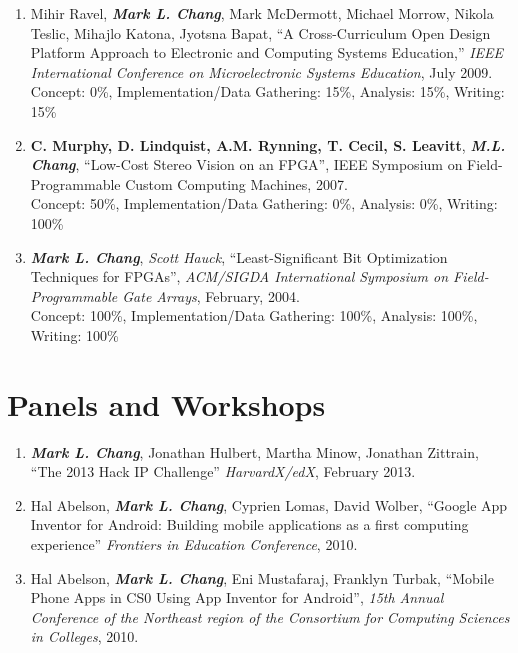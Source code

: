 \documentclass[line]{res}
\begin{document}
\begin{resume}
\begin{enumerate}
		\item Mihir Ravel, \textbf{\textit{Mark L. Chang}}, Mark McDermott, Michael Morrow, Nikola Teslic, Mihajlo Katona, Jyotsna Bapat, ``A Cross-Curriculum Open Design Platform Approach to Electronic and Computing Systems Education,'' \emph{IEEE International Conference on Microelectronic Systems Education}, July 2009.\\
		Concept: 0\%, Implementation/Data Gathering: 15\%, Analysis: 15\%, Writing: 15\%
		
		\item \textbf{C. Murphy, D. Lindquist, A.M. Rynning, T. Cecil, S. Leavitt}, \textbf{\textit{M.L. Chang}}, ``Low-Cost Stereo Vision on an FPGA'', IEEE Symposium on Field-Programmable Custom Computing Machines, 2007.\\
		Concept: 50\%, Implementation/Data Gathering: 0\%, Analysis: 0\%, Writing: 100\%
		
		\item \textbf{\textit{Mark L. Chang}}, \textit{Scott Hauck}, ``Least-Significant Bit Optimization Techniques for FPGAs'', \emph{ACM/SIGDA International Symposium on Field-Programmable Gate Arrays}, February, 2004.\\
		Concept: 100\%, Implementation/Data Gathering: 100\%, Analysis: 100\%, Writing: 100\%
	\end{enumerate}
	
	\section{\sc Panels and Workshops}
	\begin{enumerate}
		\item \textbf{\textit{Mark L. Chang}}, Jonathan Hulbert, Martha Minow, Jonathan Zittrain, ``The 2013 Hack IP Challenge'' \textit{HarvardX/edX}, February 2013.
		
		\item Hal Abelson, \textbf{\textit{Mark L. Chang}}, Cyprien Lomas, David Wolber, ``Google App Inventor for Android: Building mobile applications as a first computing experience'' \textit{Frontiers in Education Conference}, 2010.
		
		\item Hal Abelson, \textbf{\textit{Mark L. Chang}}, Eni Mustafaraj, Franklyn Turbak, ``Mobile Phone Apps in CS0 Using App Inventor for Android'', \textit{15th Annual Conference of the Northeast region of the Consortium for Computing Sciences in Colleges}, 2010.
		

\end{enumerate}
\end{resume}
\end{document}
